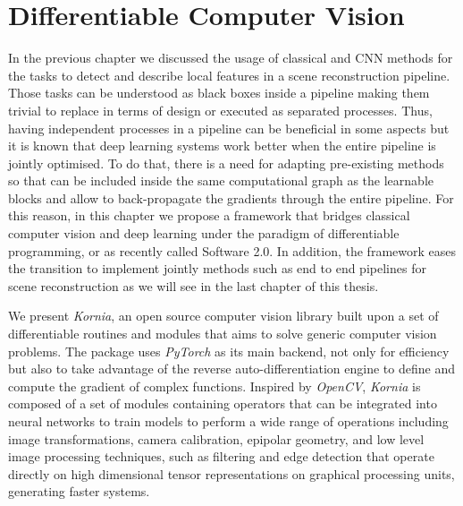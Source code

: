 \chapter{Differentiable Computer Vision}
\label{chap:chap_03}

\newcommand{\lib}{\textit{Kornia}}

In the previous chapter we discussed the usage of classical and CNN methods for the tasks to detect and describe local features in a scene reconstruction pipeline. Those tasks can be understood as black boxes inside a pipeline making them trivial to replace in terms of design or executed as separated processes. Thus, having independent processes in a pipeline can be beneficial in some aspects but it is known that deep learning systems work better when the entire pipeline is jointly optimised. To do that, there is a need for adapting pre-existing methods so that can be included inside the same computational graph as the learnable blocks and allow to back-propagate the gradients through the entire pipeline. For this reason, in this chapter we propose a framework that bridges classical computer vision and deep learning under the paradigm of differentiable programming, or as recently called Software 2.0. In addition, the framework eases the transition to implement jointly methods such as end to end pipelines for scene reconstruction as we will see in the last chapter of this thesis.

We present \lib{}, an open source computer vision library built upon a set of differentiable routines and modules that aims to solve generic computer vision problems. The package uses \textit{PyTorch} as its main backend, not only for efficiency but also to take advantage of the reverse auto-differentiation engine to define and compute the gradient of complex functions. Inspired by \textit{OpenCV}, \lib{} is composed of a set of modules containing operators that can be integrated into neural networks to train models to perform a wide range of operations including image transformations, camera calibration, epipolar geometry, and low level image processing techniques, such as filtering and edge detection that operate directly on high dimensional tensor representations on graphical processing units, generating faster systems.

